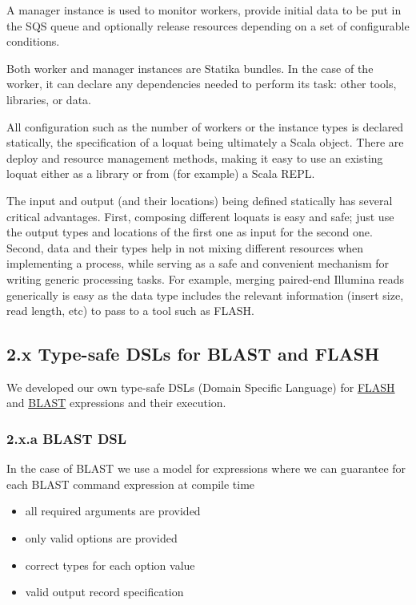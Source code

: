 \documentclass{frontiersSCNS} %
\providecommand{\tightlist}{%
\setlength{\itemsep}{0pt}\setlength{\parskip}{0pt}}
\begin{document}
A manager instance is used to monitor workers, provide initial data to
be put in the SQS queue and optionally release resources depending on a
set of configurable conditions.

Both worker and manager instances are Statika bundles. In the case of
the worker, it can declare any dependencies needed to perform its task:
other tools, libraries, or data.

All configuration such as the number of workers or the instance types is
declared statically, the specification of a loquat being ultimately a
Scala object. There are deploy and resource management methods, making
it easy to use an existing loquat either as a library or from (for
example) a Scala REPL.

The input and output (and their locations) being defined statically has
several critical advantages. First, composing different loquats is easy
and safe; just use the output types and locations of the first one as
input for the second one. Second, data and their types help in not
mixing different resources when implementing a process, while serving as
a safe and convenient mechanism for writing generic processing tasks.
For example, merging paired-end Illumina reads generically is easy as
the data type includes the relevant information (insert size, read
length, etc) to pass to a tool such as FLASH.

\subsection{2.x Type-safe DSLs for BLAST and
FLASH}\label{x-type-safe-dsls-for-blast-and-flash}

We developed our own type-safe DSLs (Domain Specific Language) for
\href{https://github.com/ohnosequences/flash}{FLASH} and
\href{https://github.com/ohnosequences/blast}{BLAST} expressions and
their execution.

\subsubsection{2.x.a BLAST DSL}\label{x.a-blast-dsl}

In the case of BLAST we use a model for expressions where we can
guarantee for each BLAST command expression at compile time

\begin{itemize}
\tightlist
\item
  all required arguments are provided
\item
  only valid options are provided
\item
  correct types for each option value
\item
  valid output record specification
\end{itemize}
\end{document}
